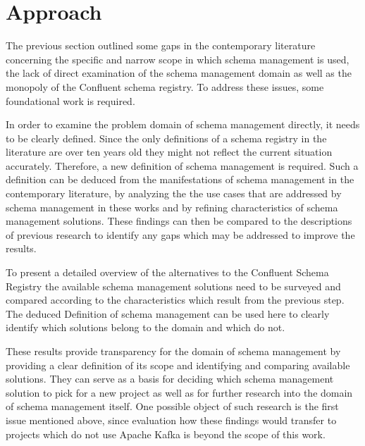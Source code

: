 
\section{Approach}\label{sec:approach}

The previous section outlined some gaps in the contemporary literature concerning the specific and narrow scope in which schema management is used, the lack of direct examination of the schema management domain as well as the monopoly of the Confluent schema registry.
To address these issues, some foundational work is required.

In order to examine the problem domain of schema management directly, it needs to be clearly defined.
Since the only definitions of a schema registry in the literature are over ten years old \parencites(see)(){heery_metadata_2003}{ma_iip_2010}{kreps_kafka_2011} they might not reflect the current situation accurately.
Therefore, a new definition of schema management is required.
Such a definition can be deduced from the manifestations of schema management in the contemporary literature, by analyzing the the use cases that are addressed by schema management in these works and by refining characteristics of schema management solutions.
These findings can then be compared to the descriptions of previous research to identify any gaps which may be addressed to improve the results.

To present a detailed overview of the alternatives to the Confluent Schema Registry the available schema management solutions need to be surveyed and compared according to the characteristics which result from the previous step.
The deduced Definition of schema management can be used here to clearly identify which solutions belong to the domain and which do not.

These results provide transparency for the domain of schema management by providing a clear definition of its scope and identifying and comparing available solutions.
They can serve as a basis for deciding which schema management solution to pick for a new project as well as for further research into the domain of schema management itself.
One possible object of such research is the first issue mentioned above, since evaluation how these findings would transfer to projects which do not use Apache Kafka is beyond the scope of this work.
